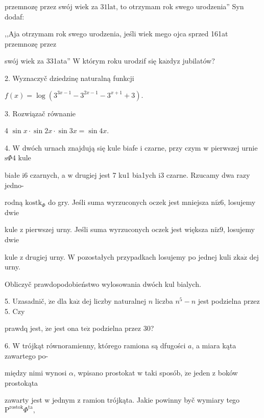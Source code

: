 \documentclass[a4paper,12pt]{article}
\begin{document}
przemnozę przez swój wiek za $31\mathrm{l}\mathrm{a}\mathrm{t}$, to otrzymam rok swego urodzenia'' Syn dodaf:

,,Aja otrzymam rok swego urodzenia, jeśli wiek mego ojca sprzed 161at przemnozę przez

swój wiek za 331ata'' $\mathrm{W}$ którym roku urodzif się $\mathrm{k}\mathrm{a}\dot{\mathrm{z}}\mathrm{d}\mathrm{y}\mathrm{z}$ jubilatów?

2. Wyznaczyč dziedzinę naturalną funkcji

$f(x)=\log(3^{3x-1}-3^{2x-1}-3^{x+1}+3).$

3. Rozwiązač równanie

4 $\sin x\cdot\sin 2x\cdot\sin 3x=\sin 4x.$

4. $\mathrm{W}$ dwóch urnach znajdują się kule biafe $\mathrm{i}$ czarne, przy czym $\mathrm{w}$ pierwszej urnie $\mathrm{s}\Phi 4$ kule

białe $\mathrm{i}6$ czarnych, a $\mathrm{w}$ drugiej jest 7 ku1 bia1ych $\mathrm{i}3$ czarne. Rzucamy dwa razy jedno-

rodną $\mathrm{k}\mathrm{o}\mathrm{s}\mathrm{t}\mathrm{k}_{\Phi}$ do gry. Jeśli suma wyrzuconych oczek jest mniejsza $\mathrm{n}\mathrm{i}\dot{\mathrm{z}}6$, losujemy dwie

kule $\mathrm{z}$ pierwszej urny. Jeśli suma wyrzuconych oczek jest większa $\mathrm{n}\mathrm{i}\dot{\mathrm{z}}9$, losujemy dwie

kule $\mathrm{z}$ drugiej urny. $\mathrm{W}$ pozostałych przypadkach losujemy po jednej kuli $\mathrm{z}\mathrm{k}\mathrm{a}\dot{\mathrm{z}}$ dej urny.

Obliczyč prawdopodobieństwo wylosowania dwóch kul bialych.

5. Uzasadnič, $\dot{\mathrm{z}}\mathrm{e}$ dla $\mathrm{k}\mathrm{a}\dot{\mathrm{z}}$ dej liczby naturalnej $n$ liczba $n^{5}-n$ jest podzielna przez 5. Czy

prawdq jest, $\dot{\mathrm{z}}\mathrm{e}$ jest ona $\mathrm{t}\mathrm{e}\dot{\mathrm{z}}$ podzielna przez 30?

6. $\mathrm{W}$ trójkąt równoramienny, którego ramiona są dfugości $a$, a miara kąta zawartego po-

między nimi wynosi $\alpha$, wpisano prostokat $\mathrm{w}$ taki sposób, $\dot{\mathrm{z}}\mathrm{e}$ jeden $\mathrm{z}$ boków prostokąta

zawarty jest $\mathrm{w}$ jednym $\mathrm{z}$ ramion trójkąta. Jakie powinny byč wymiary tego $\mathrm{P}^{\mathrm{r}\mathrm{o}\mathrm{s}\mathrm{t}\mathrm{o}\mathrm{k}}\Phi^{\mathrm{t}\mathrm{a}},$
\end{document}
